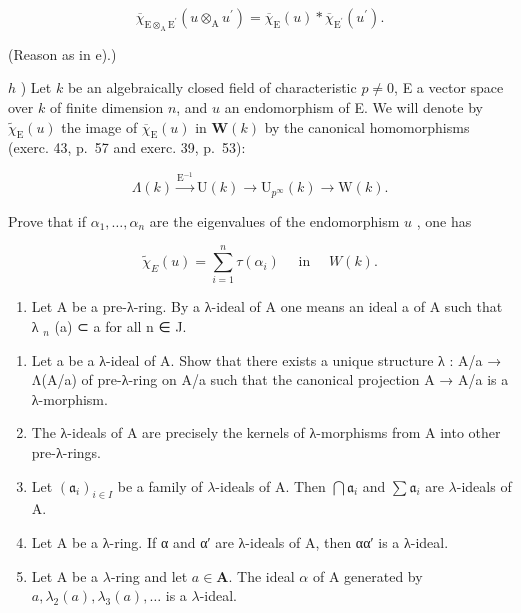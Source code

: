 \[
\overline {{{{\chi}}}} _ {\mathrm{E} \otimes_ {\mathrm{A}} \mathrm{E} ^ {\prime}} (u \otimes_ {\mathrm{A}} u ^ {\prime}) = \overline {{{{\chi}}}} _ {\mathrm{E}} (u) * \overline {{{{\chi}}}} _ {\mathrm{E} ^ {\prime}} (u ^ {\prime}).
\]

(Reason as in e).)

\(h\) ) Let \(k\) be an algebraically closed field of characteristic \(p\ne0\), E a vector space over \(k\) of finite dimension \(n\), and \(u\) an endomorphism of E. We will denote by \(\tilde{\chi}_{\mathrm{E}}(u)\) the image of \(\overline{\chi}_{\mathrm{E}}(u)\) in \(\mathbf{W}(k)\) by the canonical homomorphisms (exerc. 43, p.~57 and exerc. 39, p.~53):

\[
\Lambda (k) \xrightarrow {\mathrm{E} ^ {- 1}} \mathrm{U} (k) \longrightarrow \mathrm{U} _ {p ^ {\infty}} (k) \longrightarrow \mathrm{W} (k).
\]

Prove that if \(\alpha_{1},\ldots,\alpha_{n}\) are the eigenvalues of the endomorphism \(u\) , one has

\[
\tilde {\chi} _ {E} (u) = \sum_ {i = 1} ^ {n} \tau (\alpha_ {i}) \quad \text { in } \quad W (k).
\]

\begin{enumerate}
\def\labelenumi{\arabic{enumi})}
\setcounter{enumi}{49}
\tightlist
\item
  Let A be a pre-λ-ring. By a λ-ideal of A one means an ideal a of A such that λ \(_{n}\) (a) ⊂ a for all n ∈ J.
\end{enumerate}

\begin{enumerate}
\def\labelenumi{\alph{enumi})}
\item
  Let a be a λ-ideal of A. Show that there exists a unique structure λ : A/a → Λ(A/a) of pre-λ-ring on A/a such that the canonical projection A → A/a is a λ-morphism.
\item
  The λ-ideals of A are precisely the kernels of λ-morphisms from A into other pre-λ-rings.
\item
  Let \((\mathfrak{a}_i)_{i\in I}\) be a family of \(\lambda\)-ideals of A. Then \(\bigcap \mathfrak{a}_i\) and \(\sum \mathfrak{a}_i\) are \(\lambda\)-ideals of A.
\item
  Let A be a λ-ring. If α and α′ are λ-ideals of A, then αα′ is a λ-ideal.
\item
  Let A be a \(\lambda\)-ring and let \(a \in \mathbf{A}\). The ideal \(\alpha\) of A generated by \(a, \lambda_2(a), \lambda_3(a), \ldots\) is a \(\lambda\)-ideal.
\end{enumerate}

